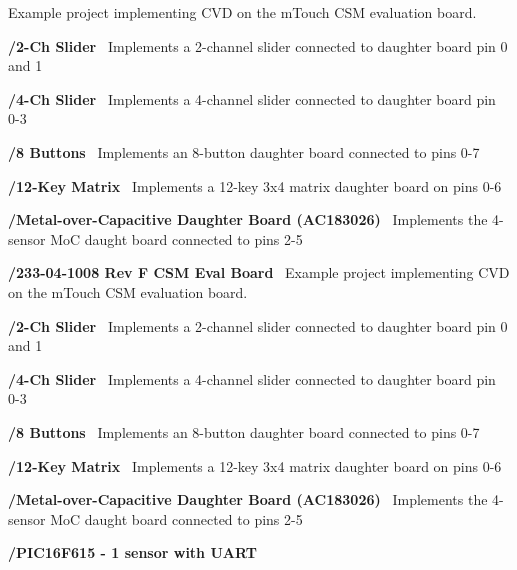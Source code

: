 \begin{DoxyItemize}
\begin{DoxyItemize}
\begin{DoxyItemize}
 Example project implementing C\+V\+D on the m\+Touch C\+S\+M evaluation board. 
\begin{DoxyItemize}
\item {\bfseries /2-\/\+Ch Slider}~\newline
 Implements a 2-\/channel slider connected to daughter board pin 0 and 1 
\item {\bfseries /4-\/\+Ch Slider}~\newline
 Implements a 4-\/channel slider connected to daughter board pin 0-\/3 
\item {\bfseries /8 Buttons}~\newline
 Implements an 8-\/button daughter board connected to pins 0-\/7 
\item {\bfseries /12-\/\+Key Matrix}~\newline
 Implements a 12-\/key 3x4 matrix daughter board on pins 0-\/6 
\item {\bfseries /\+Metal-\/over-\/\+Capacitive Daughter Board (A\+C183026)}~\newline
 Implements the 4-\/sensor Mo\+C daught board connected to pins 2-\/5 
\end{DoxyItemize}
\item {\bfseries /233-\/04-\/1008 Rev F C\+S\+M Eval Board}~\newline
 Example project implementing C\+V\+D on the m\+Touch C\+S\+M evaluation board. 
\begin{DoxyItemize}
\item {\bfseries /2-\/\+Ch Slider}~\newline
 Implements a 2-\/channel slider connected to daughter board pin 0 and 1 
\item {\bfseries /4-\/\+Ch Slider}~\newline
 Implements a 4-\/channel slider connected to daughter board pin 0-\/3 
\item {\bfseries /8 Buttons}~\newline
 Implements an 8-\/button daughter board connected to pins 0-\/7 
\item {\bfseries /12-\/\+Key Matrix}~\newline
 Implements a 12-\/key 3x4 matrix daughter board on pins 0-\/6 
\item {\bfseries /\+Metal-\/over-\/\+Capacitive Daughter Board (A\+C183026)}~\newline
 Implements the 4-\/sensor Mo\+C daught board connected to pins 2-\/5 
\end{DoxyItemize}
\item {\bfseries /\+P\+I\+C16\+F615 -\/ 1 sensor with U\+A\+R\+T}~\newline

\end{DoxyItemize}
\end{DoxyItemize}
\end{DoxyItemize}
